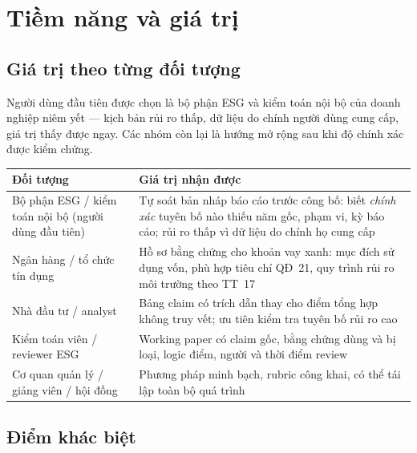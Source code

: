 \documentclass[11pt,a4paper]{article}
\begin{document}
\section{Tiềm năng và giá trị}

\subsection{Giá trị theo từng đối tượng}

Người dùng đầu tiên được chọn là bộ phận ESG và kiểm toán nội bộ của doanh nghiệp niêm yết — kịch bản rủi ro thấp, dữ liệu do chính người dùng cung cấp, giá trị thấy được ngay. Các nhóm còn lại là hướng mở rộng sau khi độ chính xác được kiểm chứng.

\begin{table}[!htbp]\small
\begin{tabularx}{\linewidth}{L{3.4cm} X}
\toprule
\textbf{Đối tượng} & \textbf{Giá trị nhận được} \\
\midrule
Bộ phận ESG / kiểm toán nội bộ (người dùng đầu tiên) & Tự soát bản nháp báo cáo trước công bố: biết \emph{chính xác} tuyên bố nào thiếu năm gốc, phạm vi, kỳ báo cáo; rủi ro thấp vì dữ liệu do chính họ cung cấp \\
Ngân hàng / tổ chức tín dụng & Hồ sơ bằng chứng cho khoản vay xanh: mục đích sử dụng vốn, phù hợp tiêu chí QĐ~21, quy trình rủi ro môi trường theo TT~17 \\
Nhà đầu tư / analyst & Bảng claim có trích dẫn thay cho điểm tổng hợp không truy vết; ưu tiên kiểm tra tuyên bố rủi ro cao \\
Kiểm toán viên / reviewer ESG & Working paper có claim gốc, bằng chứng dùng và bị loại, logic điểm, người và thời điểm review \\
Cơ quan quản lý / giảng viên / hội đồng & Phương pháp minh bạch, rubric công khai, có thể tái lập toàn bộ quá trình \\
\bottomrule
\end{tabularx}
\end{table}

\subsection{Điểm khác biệt}
\end{document}
